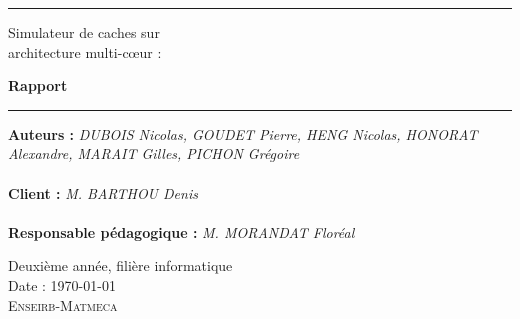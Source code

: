 \thispagestyle{empty}

\hrule
\begin{flushleft}
\huge{Simulateur de caches sur\\architecture multi-c\oe ur :}\\
\end{flushleft}
\begin{flushright}
\Huge\textbf{Rapport}\\
\end{flushright}
\hrule

\noindent\textbf{Auteurs :}
\emph{DUBOIS Nicolas, GOUDET Pierre, HENG Nicolas, HONORAT Alexandre, MARAIT Gilles, PICHON Grégoire}\\
\\
\noindent\textbf{Client :}
\emph{M. BARTHOU Denis}\\
\\
\noindent\textbf{Responsable pédagogique :}
\emph{M. MORANDAT Floréal} 

\normalsize
\begin{center}
  Deuxième année, filière informatique\\
  Date : \today\\
  \textsc{Enseirb-Matmeca}
\end{center}
